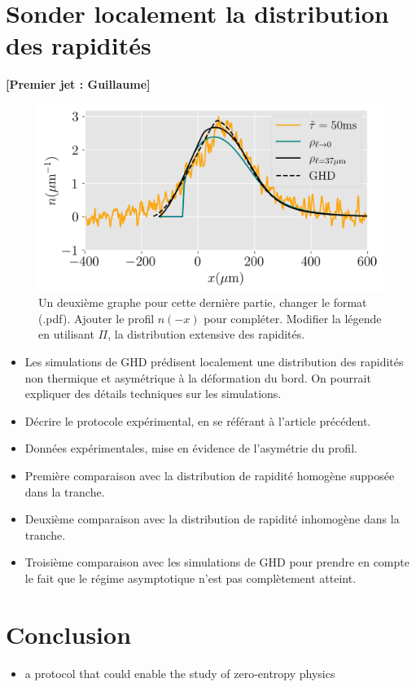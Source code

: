 \documentclass[submission, Phys]{SciPost}
\begin{document}
 {\color{blue}
 \section*{Sonder localement la distribution des rapidités}
{\bf [Premier jet : Guillaume]}
\label{sec:local}

 \begin{figure}[!htb]
     \centering
     \includegraphics[width=0.8\linewidth]{Figures/asymetrie_GHD_all.png}
     \caption{Un deuxième graphe pour cette dernière partie, changer le format (.pdf). Ajouter le profil $n(-x)$ pour compléter. Modifier la légende en utilisant $\Pi$, la distribution extensive des rapidités.}
     \label{fig:local}
 \end{figure}

 \begin{itemize}
     \item Les simulations de GHD prédisent localement une distribution des rapidités non thermique et asymétrique à la déformation du bord. On pourrait expliquer des détails techniques sur les simulations.
     \item Décrire le protocole expérimental, en se référant à l'article précédent.
     \item Données expérimentales, mise en évidence de l'asymétrie du profil.
     \item Première comparaison avec la distribution de rapidité homogène supposée dans la tranche.
     \item Deuxième comparaison avec la distribution de rapidité inhomogène dans la tranche.
     \item Troisième comparaison avec les simulations de GHD pour prendre en compte le fait que le régime asymptotique n'est pas complètement atteint.
 \end{itemize}
}

\section{Conclusion}
\begin{itemize}
    \item a protocol that could enable the study of zero-entropy physics
\end{itemize}
\end{document}
